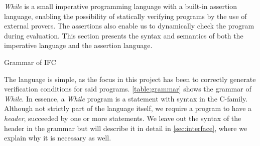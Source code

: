 \textit{While} is a small imperative programming language with a built-in assertion language, enabling the possibility of statically verifying programs by the use of external provers.
The assertions also enable us to dynamically check the program during evaluation.
This section presents the syntax and semantics of both the imperative language and the assertion language.


\begin{table}[p]

\caption{Grammar of IFC}
\label{table:grammar}
\end{table}

The language is simple, as the focus in this project has been to correctly generate verification conditions for said programs.
\cref{table:grammar} shows the grammar of \textit{While}.
In essence, a \textit{While} program is a statement with syntax in the C-family.
Although not strictly part of the language itself, we require a program to have a \textit{header}, succeeded by one or more statements.
We leave out the syntax of the header in the grammar but will describe it in detail in \cref{sec:interface}, where we explain why it is necessary as well.

